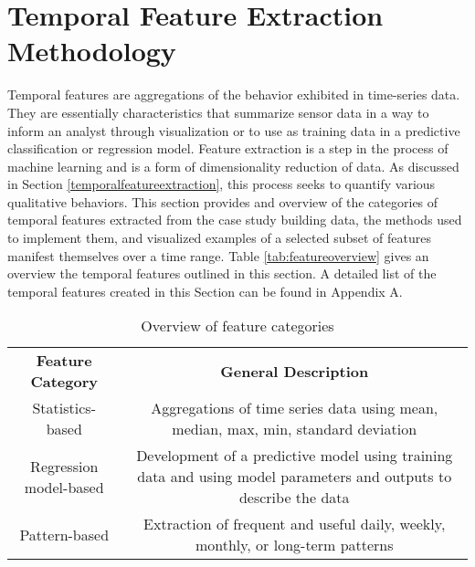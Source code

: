 \section{Temporal Feature Extraction Methodology}
\label{sec:featureextraction}

Temporal features are aggregations of the behavior exhibited in time-series data. They are essentially characteristics that summarize sensor data in a way to inform an analyst through visualization or to use as training data in a predictive classification or regression model. Feature extraction is a step in the process of machine learning and is a form of dimensionality reduction of data. As discussed in Section \ref{temporalfeatureextraction}, this process seeks to quantify various qualitative behaviors. This section provides and overview of the categories of temporal features extracted from the case study building data, the methods used to implement them, and visualized examples of a selected subset of features manifest themselves over a time range. Table \ref{tab:featureoverview} gives an overview the temporal features outlined in this section.  A detailed list of the temporal features created in this Section can be found in Appendix A. 

\begin{table} 
    \begin{tabular}{ c c }
        \textbf{Feature Category} &  \textbf{General Description}\\ 
        Statistics-based & Aggregations of time series data using mean, median, max, min, standard deviation \\ 
        Regression model-based & Development of a predictive model using training data and using model parameters and outputs to describe the data \\ 
        Pattern-based &  Extraction of frequent and useful daily, weekly, monthly, or long-term patterns\\ 
    \end{tabular} 
    \caption{Overview of feature categories}
\end{table}
\label{tab:featureoverview}